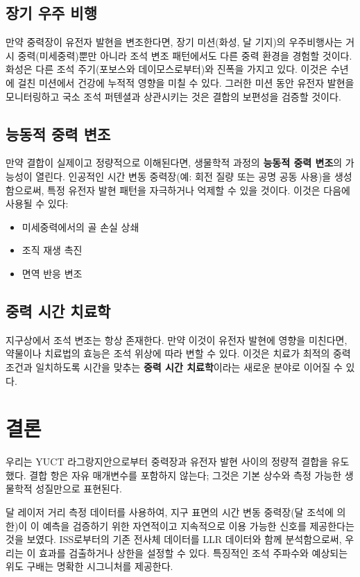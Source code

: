 \documentclass[12pt,a4paper]{article}
\theoremstyle{remark}
\begin{document}
	\subsection{장기 우주 비행}
	
	만약 중력장이 유전자 발현을 변조한다면, 장기 미션(화성, 달 기지)의 우주비행사는 거시 중력(미세중력)뿐만 아니라 조석 변조 패턴에서도 다른 중력 환경을 경험할 것이다. 화성은 다른 조석 주기(포보스와 데이모스로부터)와 진폭을 가지고 있다. 이것은 수년에 걸친 미션에서 건강에 누적적 영향을 미칠 수 있다. 그러한 미션 동안 유전자 발현을 모니터링하고 국소 조석 퍼텐셜과 상관시키는 것은 결합의 보편성을 검증할 것이다.
	
	\subsection{능동적 중력 변조}
	
	만약 결합이 실제이고 정량적으로 이해된다면, 생물학적 과정의 \textbf{능동적 중력 변조}의 가능성이 열린다. 인공적인 시간 변동 중력장(예: 회전 질량 또는 공명 공동 사용)을 생성함으로써, 특정 유전자 발현 패턴을 자극하거나 억제할 수 있을 것이다. 이것은 다음에 사용될 수 있다:
	\begin{itemize}
		\item 미세중력에서의 골 손실 상쇄
		\item 조직 재생 촉진
		\item 면역 반응 변조
	\end{itemize}
	
	\subsection{중력 시간 치료학}
	
	지구상에서 조석 변조는 항상 존재한다. 만약 이것이 유전자 발현에 영향을 미친다면, 약물이나 치료법의 효능은 조석 위상에 따라 변할 수 있다. 이것은 치료가 최적의 중력 조건과 일치하도록 시간을 맞추는 \textbf{중력 시간 치료학}이라는 새로운 분야로 이어질 수 있다.
	
	\section{결론}
	\label{sec:conclusion}
	
	우리는 YUCT 라그랑지안으로부터 중력장과 유전자 발현 사이의 정량적 결합을 유도했다. 결합 항은 자유 매개변수를 포함하지 않는다; 그것은 기본 상수와 측정 가능한 생물학적 성질만으로 표현된다.
	
	달 레이저 거리 측정 데이터를 사용하여, 지구 표면의 시간 변동 중력장(달 조석에 의한)이 이 예측을 검증하기 위한 자연적이고 지속적으로 이용 가능한 신호를 제공한다는 것을 보였다. ISS로부터의 기존 전사체 데이터를 LLR 데이터와 함께 분석함으로써, 우리는 이 효과를 검출하거나 상한을 설정할 수 있다. 특징적인 조석 주파수와 예상되는 위도 구배는 명확한 시그니처를 제공한다.
	
\end{document}
